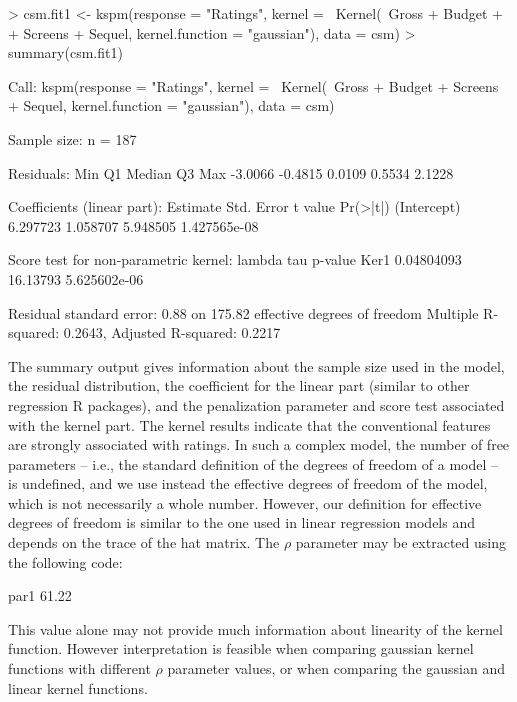 \begin{example}
> csm.fit1 <- kspm(response = "Ratings", kernel = ~Kernel(~Gross + Budget +
+    Screens + Sequel, kernel.function = "gaussian"), data = csm)
> summary(csm.fit1)
\end{example}
\begin{example}
Call:
kspm(response = "Ratings", kernel = ~Kernel(~Gross + Budget + 
    Screens + Sequel, kernel.function = "gaussian"), 
    data = csm)

Sample size:
n = 187

Residuals: 
    Min      Q1  Median      Q3     Max 
-3.0066 -0.4815  0.0109  0.5534  2.1228 

Coefficients (linear part): 
            Estimate Std. Error  t value     Pr(>|t|)
(Intercept) 6.297723   1.058707 5.948505 1.427565e-08

Score test for non-parametric kernel: 
         lambda      tau      p-value
Ker1 0.04804093 16.13793 5.625602e-06

Residual standard error: 0.88 on 175.82 effective degrees of freedom
Multiple R-squared: 0.2643, Adjusted R-squared: 0.2217
\end{example}


The summary output gives information about the sample size used in the model, the residual distribution, the coefficient for the linear part (similar to other regression R packages), and the penalization parameter and score test associated with the kernel part. The kernel results indicate that the conventional features are strongly associated with ratings. In such a complex model, the number of free parameters -- i.e., the standard definition of the degrees of freedom of a model -- is undefined, and we use instead the effective degrees of freedom of the model, which is not necessarily a whole number. However, our definition for effective degrees of freedom is similar to the one used in linear regression models and depends on the trace of the hat matrix. The $\rho$ parameter may be extracted using the following code:


\begin{example}
 par1
61.22
\end{example}


This value alone may not provide much information about linearity of the kernel function. However interpretation is feasible when comparing gaussian kernel functions with different $\rho$ parameter values, or when comparing the gaussian and linear kernel functions. 



